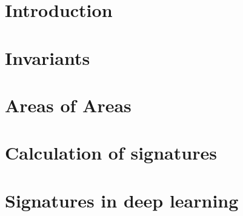 \documentclass[11pt,a4paper]{report}      %
\begin{document}
\chapter{Introduction}


\chapter{Invariants}
\label{chap:math}

\chapter{Areas of Areas}
\label{chap:aoa}

\chapter{Calculation of signatures}
\label{chap:iisig}


\chapter{Signatures in deep learning}
\label{chap:deep}

\printindex
\printbibliography[heading=bibintoc]
\end{document}
